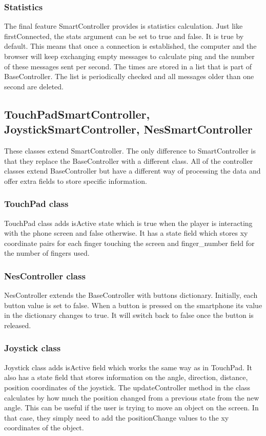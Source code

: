 \documentclass{l4proj}
\begin{document}
\subsubsection{Statistics}
The final feature SmartController provides is statistics calculation. Just like firstConnected, the stats argument can be set to true and false. It is true by default. This means that once a connection is established, the computer and the browser will keep exchanging empty messages to calculate ping and the number of these messages sent per second. The times are stored in a list that is part of BaseController. The list is periodically checked and all messages older than one second are deleted. 


\subsection{TouchPadSmartController, JoystickSmartController, NesSmartController}
These classes extend SmartController. The only difference to SmartController is that they replace the BaseController with a different class. All of the controller classes extend BaseController but have a different way of processing the data and offer extra fields to store specific information. \par

\subsubsection{TouchPad class} TouchPad class adds isActive state which is true when the player is interacting with the phone screen and false otherwise. It has a state field which stores xy coordinate pairs for each finger touching the screen and finger\_number field for the number of fingers used. 

\subsubsection{NesController class} NesController extends the BaseController with buttons dictionary. Initially, each button value is set to false. When a button is pressed on the smartphone its value in the dictionary changes to true. It will switch back to false once the button is released. 

\subsubsection{Joystick class} Joystick class adds isActive field which works the same way as in TouchPad. It also has a state field that stores information on the angle, direction, distance, position coordinates of the joystick. The updateController method in the class calculates by how much the position changed from a previous state from the new angle. This can be useful if the user is trying to move an object on the screen. In that case, they simply need to add the positionChange values to the xy coordinates of the object.
\end{document}
